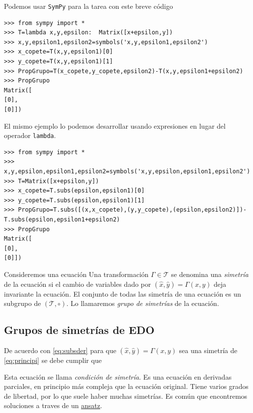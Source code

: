 Podemos usar \texttt{SymPy} para la tarea con este breve código
\begin{lstlisting}
>>> from sympy import *
>>> T=lambda x,y,epsilon:  Matrix([x+epsilon,y])
>>> x,y,epsilon1,epsilon2=symbols('x,y,epsilon1,epsilon2')
>>> x_copete=T(x,y,epsilon1)[0]
>>> y_copete=T(x,y,epsilon1)[1]
>>> PropGrupo=T(x_copete,y_copete,epsilon2)-T(x,y,epsilon1+epsilon2)
>>> PropGrupo
Matrix([
[0],
[0]])
\end{lstlisting}


El mismo ejemplo lo podemos desarrollar usando expresiones en lugar del operador \texttt{lambda}.
\begin{lstlisting}
>>> from sympy import *
>>> x,y,epsilon,epsilon1,epsilon2=symbols('x,y,epsilon,epsilon1,epsilon2')
>>> T=Matrix([x+epsilon,y])
>>> x_copete=T.subs(epsilon,epsilon1)[0]
>>> y_copete=T.subs(epsilon,epsilon1)[1]
>>> PropGrupo=T.subs([(x,x_copete),(y,y_copete),(epsilon,epsilon2)])-T.subs(epsilon,epsilon1+epsilon2)
>>> PropGrupo
Matrix([
[0],
[0]])
\end{lstlisting}


\begin{definicion}
 Consideremos una ecuación
Una transformación $\Gamma\in \mathscr{T}$ se denomina una \emph{simetría} de la ecuación si el cambio de variables dado por $(\hat{x},\hat{y})=\Gamma(x,y)$ deja invariante  la ecuación.   El conjunto de todas las simetría de una ecuación es un subgrupo de  $( \mathscr{T},\circ)$. Lo llamaremos \emph{grupo de simetrías} de la ecuación.

\end{definicion}



\subsection{Grupos de simetrías de EDO}
 De acuerdo con \eqref{eq:subsder} para que $(\hat{x},\hat{y})=\Gamma(x,y)$ sea una simetría de \eqref{eq:principi} se debe cumplir que

 Esta ecuación se llama \emph{condición de simetría}. Es una ecuación en derivadas parciales, en principio más compleja que la ecuación original. Tiene varios grados de libertad, por lo que suele haber muchas simetrías.  Es común que encontremos soluciones a  traves de un  \href{http://es.wikipedia.org/wiki/Ansatz}{ansatz}.





